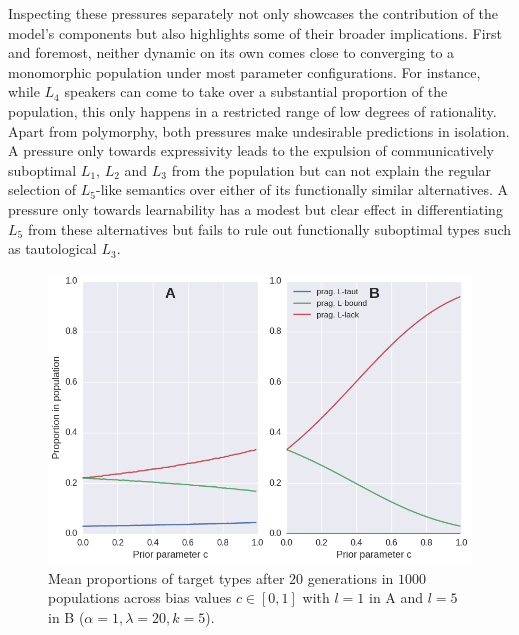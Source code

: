 \documentclass[a4paper]{article}
\begin{document}
Inspecting these pressures separately not only showcases the contribution of the model's components but also highlights some of their broader implications. First and foremost, neither dynamic on its own comes close to converging to a monomorphic population under most parameter configurations. For instance, while $L_4$ speakers can come to take over a substantial proportion of the population, this only happens in a restricted range of low degrees of rationality. Apart from polymorphy, both pressures make undesirable predictions in isolation. A pressure only towards expressivity leads to the expulsion of communicatively suboptimal $L_1$, $L_2$ and $L_3$ from the population but can not explain the regular selection of $L_5$-like semantics over either of its functionally similar alternatives. A pressure only towards learnability has a modest but clear effect in differentiating $L_5$ from these alternatives but fails to rule out functionally suboptimal types such as tautological $L_3$. 

\begin{figure}
\centering
\includegraphics[scale=.5]{./fig2-rmd}
\caption{Mean proportions of target types after $20$ generations in $1000$ populations across bias values $c \in [0,1]$ with $l =1$ in A and $l = 5$ in B ($\alpha =1, \lambda = 20, k = 5$).}
\label{fig:cost}
\end{figure}
\end{document}
